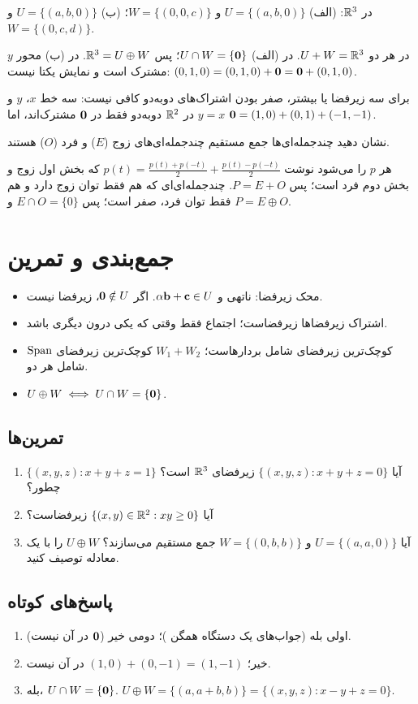 \begin{example}
در $\mathbb{R}^3$: (الف) $U=\{(a,b,0)\}$ و $W=\{(0,0,c)\}$؛ (ب) $U=\{(a,b,0)\}$ و $W=\{(0,c,d)\}$.
\end{example}
\begin{solution}
در هر دو $U+W=\mathbb{R}^3$. در (الف) $U\cap W=\{\mathbf{0}\}$؛ پس $\mathbb{R}^3=U\oplus W$. در (ب) محور $y$ مشترک است و نمایش یکتا نیست: $(0,1,0)=(0,1,0)+\mathbf{0}=\mathbf{0}+(0,1,0)$.
\end{solution}

\begin{warning}
برای سه زیرفضا یا بیشتر، صفر بودن اشتراک‌های دوبه‌دو کافی نیست: سه خط $x$، $y$ و $y=x$ در $\mathbb{R}^2$ دوبه‌دو فقط در $\mathbf{0}$ مشترک‌اند، اما $\mathbf{0}=(1,0)+(0,1)+(-1,-1)$.
\end{warning}

\begin{example}
نشان دهید چندجمله‌ای‌ها جمع مستقیم چندجمله‌ای‌های زوج ($E$) و فرد ($O$) هستند.
\end{example}
\begin{solution}
هر $p$ را می‌شود نوشت
$p(t)=\frac{p(t)+p(-t)}{2}+\frac{p(t)-p(-t)}{2}$
که بخش اول زوج و بخش دوم فرد است؛ پس $P=E+O$. چندجمله‌ای‌ای که هم فقط توان زوج دارد و هم فقط توان فرد، صفر است؛ پس $E\cap O=\{0\}$ و $P=E\oplus O$.
\end{solution}

\section{جمع‌بندی و تمرین}

\begin{summary}
\begin{itemize}
  \item محک زیرفضا: ناتهی و $\alpha\mathbf{b}+\mathbf{c}\in U$. اگر $\mathbf{0}\notin U$، زیرفضا نیست.
  \item اشتراک زیرفضاها زیرفضاست؛ اجتماع فقط وقتی که یکی درون دیگری باشد.
  \item $\operatorname{Span}$ کوچک‌ترین زیرفضای شامل بردارهاست؛ $W_1+W_2$ کوچک‌ترین زیرفضای شامل هر دو.
  \item $U\oplus W\iff U\cap W=\{\mathbf{0}\}$.
\end{itemize}
\end{summary}

\subsection*{تمرین‌ها}
\begin{enumerate}
  \item آیا $\{(x,y,z): x+y+z=0\}$ زیرفضای $\mathbb{R}^3$ است؟ $\{(x,y,z): x+y+z=1\}$ چطور؟
  \item آیا $\{(x,y)\in\mathbb{R}^2: xy\ge0\}$ زیرفضاست؟
  \item آیا $U=\{(a,a,0)\}$ و $W=\{(0,b,b)\}$ جمع مستقیم می‌سازند؟ $U\oplus W$ را با یک معادله توصیف کنید.
\end{enumerate}

\subsection*{پاسخ‌های کوتاه}
\begin{enumerate}
  \item اولی بله (جواب‌های یک دستگاه همگن )؛ دومی خیر ($\mathbf{0}$ در آن نیست).
  \item خیر؛ $(1,0)+(0,-1)=(1,-1)$ در آن نیست.
  \item بله، $U\cap W=\{\mathbf{0}\}$. $U\oplus W=\{(a,a+b,b)\}=\{(x,y,z): x-y+z=0\}$.
\end{enumerate}
